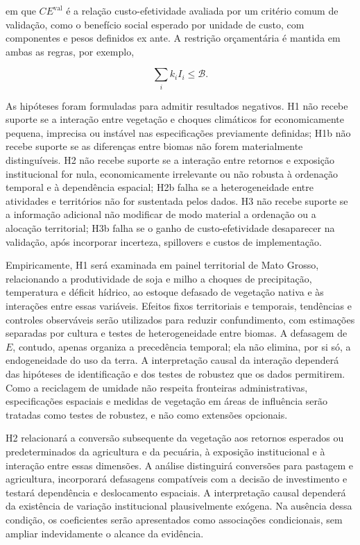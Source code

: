 em que $CE^{\mathrm{val}}$ é a relação custo-efetividade avaliada por um critério comum de validação, como o benefício social esperado por unidade de custo, com componentes e pesos definidos ex ante. A restrição orçamentária é mantida em ambas as regras, por exemplo,

\begin{equation}
    \sum_i k_i I_i \leq \mathcal{B}.
    \label{eq:budget_constraint}
\end{equation}

As hipóteses foram formuladas para admitir resultados negativos. H1 não recebe suporte se a interação entre vegetação e choques climáticos for economicamente pequena, imprecisa ou instável nas especificações previamente definidas; H1b não recebe suporte se as diferenças entre biomas não forem materialmente distinguíveis. H2 não recebe suporte se a interação entre retornos e exposição institucional for nula, economicamente irrelevante ou não robusta à ordenação temporal e à dependência espacial; H2b falha se a heterogeneidade entre atividades e territórios não for sustentada pelos dados. H3 não recebe suporte se a informação adicional não modificar de modo material a ordenação ou a alocação territorial; H3b falha se o ganho de custo-efetividade desaparecer na validação, após incorporar incerteza, spillovers e custos de implementação.

Empiricamente, H1 será examinada em painel territorial de Mato Grosso, relacionando a produtividade de soja e milho a choques de precipitação, temperatura e déficit hídrico, ao estoque defasado de vegetação nativa e às interações entre essas variáveis. Efeitos fixos territoriais e temporais, tendências e controles observáveis serão utilizados para reduzir confundimento, com estimações separadas por cultura e testes de heterogeneidade entre biomas. A defasagem de $E$, contudo, apenas organiza a precedência temporal; ela não elimina, por si só, a endogeneidade do uso da terra. A interpretação causal da interação dependerá das hipóteses de identificação e dos testes de robustez que os dados permitirem. Como a reciclagem de umidade não respeita fronteiras administrativas, especificações espaciais e medidas de vegetação em áreas de influência serão tratadas como testes de robustez, e não como extensões opcionais.

H2 relacionará a conversão subsequente da vegetação aos retornos esperados ou predeterminados da agricultura e da pecuária, à exposição institucional e à interação entre essas dimensões. A análise distinguirá conversões para pastagem e agricultura, incorporará defasagens compatíveis com a decisão de investimento e testará dependência e deslocamento espaciais. A interpretação causal dependerá da existência de variação institucional plausivelmente exógena. Na ausência dessa condição, os coeficientes serão apresentados como associações condicionais, sem ampliar indevidamente o alcance da evidência.

